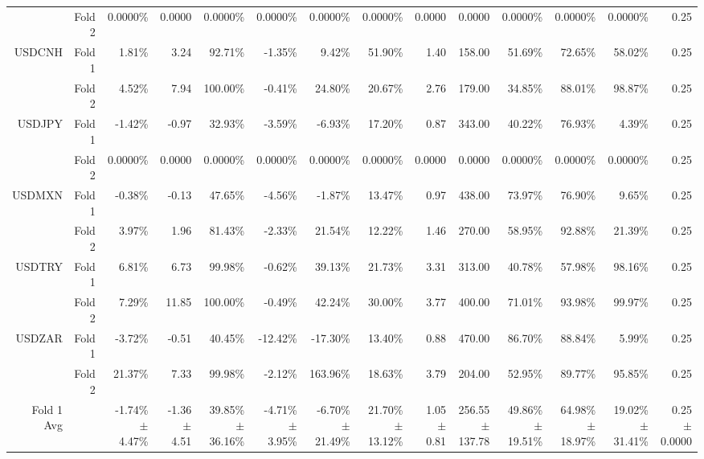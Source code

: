 \begin{table}[H]
{\begin{tabular}{rrrrrrrrrrrrrr}
 & Fold 2 & 0.0000\% & 0.0000 & 0.0000\% & 0.0000\% & 0.0000\% & 0.0000\% & 0.0000 & 0.0000 & 0.0000\% & 0.0000\% & 0.0000\% & 0.25 \\
USDCNH & Fold 1 & 1.81\% & 3.24 & 92.71\% & -1.35\% & 9.42\% & 51.90\% & 1.40 & 158.00 & 51.69\% & 72.65\% & 58.02\% & 0.25 \\
 & Fold 2 & 4.52\% & 7.94 & 100.00\% & -0.41\% & 24.80\% & 20.67\% & 2.76 & 179.00 & 34.85\% & 88.01\% & 98.87\% & 0.25 \\
USDJPY & Fold 1 & -1.42\% & -0.97 & 32.93\% & -3.59\% & -6.93\% & 17.20\% & 0.87 & 343.00 & 40.22\% & 76.93\% & 4.39\% & 0.25 \\
 & Fold 2 & 0.0000\% & 0.0000 & 0.0000\% & 0.0000\% & 0.0000\% & 0.0000\% & 0.0000 & 0.0000 & 0.0000\% & 0.0000\% & 0.0000\% & 0.25 \\
USDMXN & Fold 1 & -0.38\% & -0.13 & 47.65\% & -4.56\% & -1.87\% & 13.47\% & 0.97 & 438.00 & 73.97\% & 76.90\% & 9.65\% & 0.25 \\
 & Fold 2 & 3.97\% & 1.96 & 81.43\% & -2.33\% & 21.54\% & 12.22\% & 1.46 & 270.00 & 58.95\% & 92.88\% & 21.39\% & 0.25 \\
USDTRY & Fold 1 & 6.81\% & 6.73 & 99.98\% & -0.62\% & 39.13\% & 21.73\% & 3.31 & 313.00 & 40.78\% & 57.98\% & 98.16\% & 0.25 \\
 & Fold 2 & 7.29\% & 11.85 & 100.00\% & -0.49\% & 42.24\% & 30.00\% & 3.77 & 400.00 & 71.01\% & 93.98\% & 99.97\% & 0.25 \\
USDZAR & Fold 1 & -3.72\% & -0.51 & 40.45\% & -12.42\% & -17.30\% & 13.40\% & 0.88 & 470.00 & 86.70\% & 88.84\% & 5.99\% & 0.25 \\
 & Fold 2 & 21.37\% & 7.33 & 99.98\% & -2.12\% & 163.96\% & 18.63\% & 3.79 & 204.00 & 52.95\% & 89.77\% & 95.85\% & 0.25 \\
\midrule
\midrule
Fold 1 Avg &  & \shortstack{-1.74\% \\ $\pm$ 4.47\%} & \shortstack{-1.36 \\ $\pm$ 4.51} & \shortstack{39.85\% \\ $\pm$ 36.16\%} & \shortstack{-4.71\% \\ $\pm$ 3.95\%} & \shortstack{-6.70\% \\ $\pm$ 21.49\%} & \shortstack{21.70\% \\ $\pm$ 13.12\%} & \shortstack{1.05 \\ $\pm$ 0.81} & \shortstack{256.55 \\ $\pm$ 137.78} & \shortstack{49.86\% \\ $\pm$ 19.51\%} & \shortstack{64.98\% \\ $\pm$ 18.97\%} & \shortstack{19.02\% \\ $\pm$ 31.41\%} & \shortstack{0.25 \\ $\pm$ 0.0000} \\

\end{tabular}}
\end{table}
